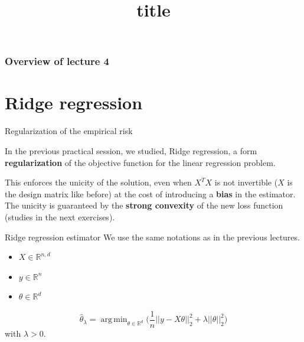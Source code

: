 \documentclass[usenames,dvipsnames]{beamer}
\title[FTML]{title}
\date{} %
\DeclareMathOperator*{\argmin}{arg\,min}
\begin{document}
\begin{frame}
\titlepage %
\end{frame}

\begin{frame}
\frametitle{Overview of lecture 4} %
\tableofcontents %
\end{frame}

\section{Ridge regression}

\begin{frame}{Regularization of the empirical risk}

    In the previous practical session, we studied, Ridge regression, a form \textbf{{regularization}} of the objective function for the linear regression problem.

    This enforces the unicity of the solution, even when $X^TX$ is not invertible ($X$ is the design matrix like before) at the cost of introducing a \textbf{{bias}} in the estimator. The unicity is guaranteed by the \textbf{{strong convexity}} of the new loss function (studies in the next exercises).
    
\end{frame}


\begin{frame}{Ridge regression estimator}
    We use the same notations as in the previous lectures.
    \begin{itemize}
	\item $X\in \mathbb{R}^{n,d}$
	\item $y\in \mathbb{R}^{n}$
	\item $\theta\in \mathbb{R}^d$
    \end{itemize}
\begin{equation}
    \label{risk:ridge}
    \hat{ \theta}_{\lambda} = \argmin_{\theta \in \mathbb{R}^d} \Big( \frac{1}{n} ||y-X\theta||_2^2 + \lambda || \theta||_2^2 \Big)
\end{equation}
with $\lambda >0$.
\end{frame}
\end{document}

